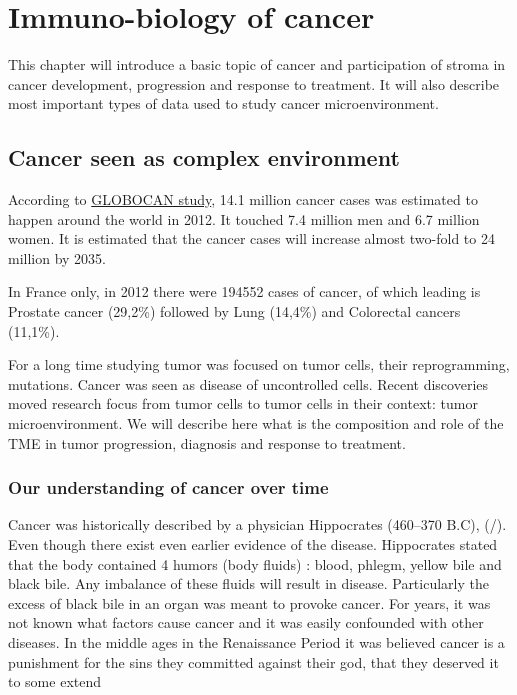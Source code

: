\documentclass[12pt,]{book}
\theoremstyle{definition}
\theoremstyle{definition}
\theoremstyle{definition}
\theoremstyle{remark}
\begin{document}
{
\setcounter{tocdepth}{4}
\tableofcontents
}
\listoftables
\listoffigures
\hypertarget{intro}{%
\chapter{Immuno-biology of cancer}\label{intro}}

\setcounter{page}{11}

This chapter will introduce a basic topic of cancer and participation of
stroma in cancer development, progression and response to treatment. It
will also describe most important types of data used to study cancer
microenvironment.

\hypertarget{cancer-seen-as-complex-environment}{%
\section{Cancer seen as complex
environment}\label{cancer-seen-as-complex-environment}}

According to
\href{http://globocan.iarc.fr/Pages/fact_sheets_cancer.aspx}{GLOBOCAN
study}, 14.1 million cancer cases was estimated to happen around the
world in 2012. It touched 7.4 million men and 6.7 million women. It is
estimated that the cancer cases will increase almost two-fold to 24
million by 2035.

In France only, in 2012 there were 194552 cases of cancer, of which
leading is Prostate cancer (29,2\%) followed by Lung (14,4\%) and
Colorectal cancers (11,1\%).

For a long time studying tumor was focused on tumor cells, their
reprogramming, mutations. Cancer was seen as disease of uncontrolled
cells. Recent discoveries moved research focus from tumor cells to tumor
cells in their context: tumor microenvironment. We will describe here
what is the composition and role of the TME in tumor progression,
diagnosis and response to treatment.

\hypertarget{our-understanding-of-cancer-over-time}{%
\subsection{Our understanding of cancer over
time}\label{our-understanding-of-cancer-over-time}}

Cancer was historically described by a physician Hippocrates (460--370
B.C), (\citet{https://www.ncbi.nlm.nih.gov/pmc/articles/PMC2927383}/).
Even though there exist even earlier evidence of the disease.
Hippocrates stated that the body contained 4 humors (body fluids) :
blood, phlegm, yellow bile and black bile. Any imbalance of these fluids
will result in disease. Particularly the excess of black bile in an
organ was meant to provoke cancer. For years, it was not known what
factors cause cancer and it was easily confounded with other diseases.
In the middle ages in the Renaissance Period it was believed cancer is a
punishment for the sins they committed against their god, that they
deserved it to some extend
\end{document}
